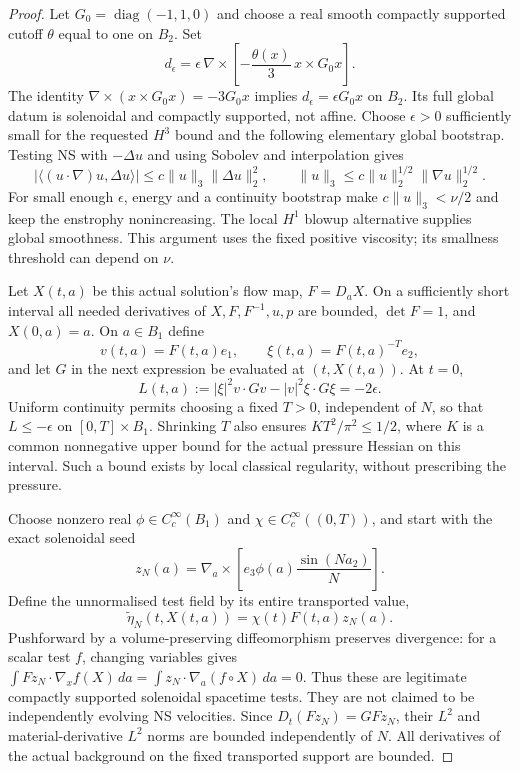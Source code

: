 \begin{proof}
Let $G_0=\operatorname{diag}(-1,1,0)$ and choose a real smooth compactly
supported cutoff $\theta$ equal to one on $B_2$. Set
\[
 d_\epsilon=\epsilon\,\nabla\times
             \left[-\frac{\theta(x)}3\,x\times G_0x\right].
\]
The identity $\nabla\times(x\times G_0x)=-3G_0x$ implies
$d_\epsilon=\epsilon G_0x$ on $B_2$. Its full global datum is solenoidal
and compactly supported, not affine. Choose $\epsilon>0$ sufficiently small
for the requested $H^3$ bound and the following elementary global bootstrap.
Testing NS with $-\Delta u$ and using Sobolev and interpolation gives
\[
 |\langle(u\cdot\nabla)u,\Delta u\rangle|
 \le c\|u\|_3\|\Delta u\|_2^2,\qquad
 \|u\|_3\le c\|u\|_2^{1/2}\|\nabla u\|_2^{1/2}.
\]
For small enough $\epsilon$, energy and a continuity bootstrap make
$c\|u\|_3<\nu/2$ and keep the enstrophy nonincreasing. The local $H^1$
blowup alternative supplies global smoothness. This argument uses the fixed
positive viscosity; its smallness threshold can depend on $\nu$.

Let $X(t,a)$ be this actual solution's flow map, $F=D_aX$. On a sufficiently
short interval all needed derivatives of $X,F,F^{-1},u,p$ are bounded,
$\det F=1$, and $X(0,a)=a$. On $a\in B_1$ define
\[
 v(t,a)=F(t,a)e_1,\qquad \xi(t,a)=F(t,a)^{-T}e_2,
\]
and let $G$ in the next expression be evaluated at $(t,X(t,a))$.
At $t=0$,
\[
 L(t,a):=|\xi|^2v\cdot Gv-|v|^2\xi\cdot G\xi=-2\epsilon.
\]
Uniform continuity permits choosing a fixed $T>0$, independent of $N$,
so that $L\le-\epsilon$ on $[0,T]\times B_1$. Shrinking $T$ also ensures
$KT^2/\pi^2\le1/2$, where $K$ is a common nonnegative upper bound for the
actual pressure Hessian on this interval. Such a bound exists by local
classical regularity, without prescribing the pressure.

Choose nonzero real $\phi\in C_c^\infty(B_1)$ and
$\chi\in C_c^\infty((0,T))$, and start with the exact solenoidal seed
\[
 z_N(a)=\nabla_a\times
           \left[e_3\phi(a)\frac{\sin(Na_2)}N\right].
\]
Define the unnormalised test field by its entire transported value,
\[
 \widetilde\eta_N(t,X(t,a))=\chi(t)F(t,a)z_N(a).
\]
Pushforward by a volume-preserving diffeomorphism preserves divergence:
for a scalar test $f$, changing variables gives
$\int Fz_N\cdot\nabla_xf(X)\,da
 =\int z_N\cdot\nabla_a(f\circ X)\,da=0$.
Thus these are legitimate compactly supported solenoidal spacetime tests.
They are not claimed to be independently evolving NS velocities.
Since $D_t(Fz_N)=G Fz_N$, their $L^2$ and material-derivative $L^2$ norms
are bounded independently of $N$. All derivatives of the actual background
on the fixed transported support are bounded.


\end{proof}
